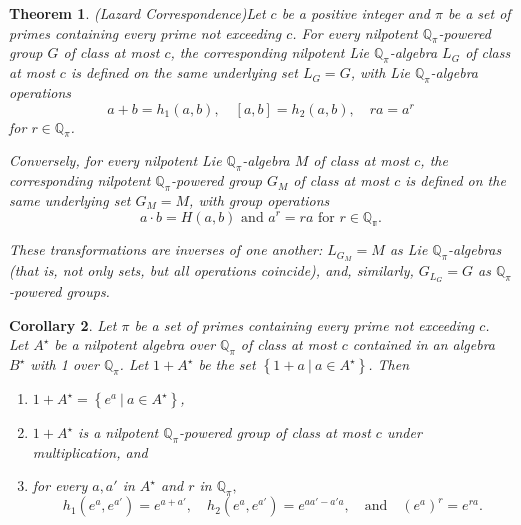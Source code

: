 \documentclass[mathscr]{amsart}
\theoremstyle{theorem}
\newtheorem{theorem}{Theorem}[section]
\newtheorem{corollary}[theorem]{Corollary}
\theoremstyle{definition}
\numberwithin{equation}{section}
\def \({\left(}
\def \){\right)}
\begin{document}
\begin{theorem}(Lazard Correspondence)\label{theo3.6}
Let $c$ be a positive integer and $\pi$ be a set of primes
containing every prime not exceeding $c$.  For every nilpotent
$\mathbb{Q}_\pi$-powered group $G$ of class at most $c$, the
corresponding nilpotent Lie $\mathbb{Q}_\pi$-algebra $L_G$ of class
at most $c$ is defined on the same underlying set $L_G=G$, with Lie
$\mathbb{Q}_\pi$-algebra operations
$$
a+b=h_1(a,b),\quad[a,b]=h_2(a,b),\quad ra=a^r
$$
for $r\in \mathbb{Q}_\pi$.

Conversely, for every nilpotent Lie $\mathbb{Q}_\pi$-algebra $M$ of
class at most $c$, the corresponding nilpotent
$\mathbb{Q}_\pi$-powered group $G_M$ of class at most $c$ is defined
on the same underlying set $G_M=M$, with group operations
$$a\cdot b=H(a,b)\text{ and }a^r=ra\text{ for }r\in\mathbb{Q_\pi}.$$

These transformations are inverses of one another: $L_{G_M}=M$ as
Lie $\mathbb{Q}_{\pi}$-algebras (that is, not only sets, but all
operations coincide), and, similarly, $G_{L_G}=G$ as
$\mathbb{Q}_\pi$-powered groups.
\end{theorem}



\begin{corollary}\label{cor3.7} Let $\pi$ be a set of primes
containing every prime not exceeding $c$.  Let $A^\star$ be a
nilpotent algebra over $\mathbb{Q}_\pi$ of class at most $c$
contained in an algebra $B^\star$ with 1 over $\mathbb{Q}_\pi$. Let
$1+A^\star$ be the set $\left\{1+a\ |\ a\in A^\star\right\}$.  Then

\begin{enumerate}
\item[(a)] $1+A^\star=\left\{e^a\ |\ a\in A^\star\right\}$,
\item[(b)] $1+A^\star$ is a nilpotent $\mathbb{Q}_\pi$-powered group of
class at most $c$ under multiplication, and
\item[(c)] for every $a,a'$ in $A^\star$ and $r$ in $\mathbb{Q}_\pi,$
$$h_1\(e^a,e^{a'}\)=e^{a+a'},\quad
h_2\(e^a,e^{a'}\)=e^{aa'-a'a},\quad\text{and}\quad
\(e^a\)^r=e^{ra}.$$
\end{enumerate}
\end{corollary}
\end{document}
